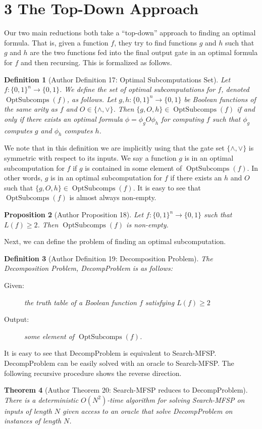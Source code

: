 \documentclass[10pt,a4paper]{article}
\newtheorem{nttheorem}{Theorem}
\newtheorem{ntdefinition}[nttheorem]{Definition}
\newtheorem{ntproposition}[nttheorem]{Proposition}
\newcommand{\Opt}{\operatorname{OptSubcomps}}
\begin{document}
\section*{3 The Top-Down Approach}
Our two main reductions both take a ``top-down'' approach to finding an optimal formula. That is, given a function $f$, they try to find functions $g$ and $h$ such that $g$ and $h$ are the two functions fed into the final output gate in an optimal formula for $f$ and then recursing.
This is formalized as follows.
\setcounter{nttheorem}{16}
\begin{ntdefinition}[Author Definition 17: Optimal Subcomputations Set]
Let $f:\{0,1\}^n\to\{0,1\}$. We define the set of optimal subcomputations for $f$, denoted $\Opt(f)$, as follows.
Let $g,h:\{0,1\}^n\to\{0,1\}$ be Boolean functions of the same arity as $f$ and $O\in\{\land,\lor\}$. Then $\{g,O,h\}\in\Opt(f)$ if and only if there exists an optimal formula $\phi=\phi_gO\phi_h$ for computing $f$ such that $\phi_g$ computes $g$ and $\phi_h$ computes $h$.
\end{ntdefinition}
We note that in this definition we are implicitly using that the gate set $\{\land,\lor\}$ is symmetric with respect to its inputs.
We say a function $g$ is in an optimal subcomputation for $f$ if $g$ is contained in some element of $\Opt(f)$. In other words, $g$ is in an optimal subcomputation for $f$ if there exists an $h$ and $O$ such that $\{g,O,h\}\in\Opt(f)$.
It is easy to see that $\Opt(f)$ is almost always non-empty.
\begin{ntproposition}[Author Proposition 18]
Let $f:\{0,1\}^n\to\{0,1\}$ such that $L(f)\geq 2$. Then $\Opt(f)$ is non-empty.
\end{ntproposition}
Next, we can define the problem of finding an optimal subcomputation.
\begin{ntdefinition}[Author Definition 19: Decomposition Problem]
The Decomposition Problem, DecompProblem is as follows:
\begin{description}\item[Given:] the truth table of a Boolean function $f$ satisfying $L(f)\geq 2$\item[Output:] some element of $\Opt(f)$.\end{description}
\end{ntdefinition}
It is easy to see that DecompProblem is equivalent to Search-MFSP. DecompProblem can be easily solved with an oracle to Search-MFSP. The following recursive procedure shows the reverse direction.
\begin{nttheorem}[Author Theorem 20: Search-MFSP reduces to DecompProblem]
There is a deterministic $O(N^2)$-time algorithm for solving Search-MFSP on inputs of length $N$ given access to an oracle that solve DecompProblem on instances of length $N$.
\end{nttheorem}
\end{document}
